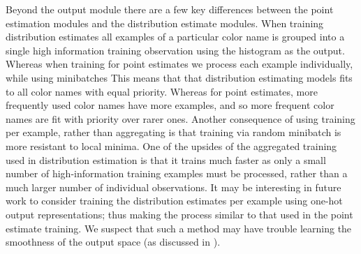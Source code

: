 \documentclass[11pt,a4paper]{article}
\begin{document}
Beyond the output module there are a few key differences between the point estimation modules and the distribution estimate modules.
When training distribution estimates all examples of a particular color name is grouped into a single high information training observation using the histogram as the output.
Whereas when training for point estimates we process each example individually, while using minibatches
This means that that distribution estimating models fits to all color names with equal priority.%
Whereas for point estimates, more frequently used color names have more examples, and so more frequent color names are fit with priority over rarer ones.
Another consequence of using training per example, rather than aggregating is that training via random minibatch is more resistant to local minima.
One of the upsides of the aggregated training used in distribution estimation is that it trains much faster as only a small number of high-information training examples must be processed, rather than a much larger number of individual observations.
It may be interesting in future work to consider training the distribution estimates per example using one-hot output representations; thus making the process similar to that used in the point estimate training.
We suspect that such a method may have trouble learning the smoothness of the output space (as discussed in ).






\end{document}
